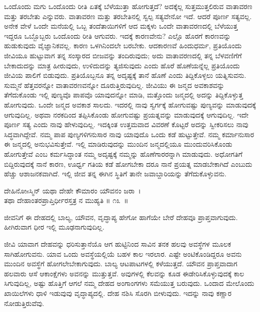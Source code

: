 ಒಂದೊಂದು ಮಗು ಒಂದೊಂದು ರೀತಿ ಏತಕ್ಕೆ ಬೆಳೆಯುತ್ತಾ ಹೋಗುತ್ತದೆ? ಅದಕ್ಕೆಲ್ಲ ಸುತ್ತಮುತ್ತಲಿರುವ ವಾತಾವರಣ ಮತ್ತು ತರಬೇತು ಎನ್ನುವರು. ವಾತಾವರಣ ಮತ್ತು ತರಬೇತಿನಲ್ಲಿ ಸ್ವಲ್ಪ ಸತ್ಯವೇನೋ ಇದೆ. ಆದರೆ ಪೂರ್ಣ ಸತ್ಯವಲ್ಲ. ಅನೇಕ ವೇಳೆ ಒಂದೇ ಮನೆಯಲ್ಲಿ ಒಬ್ಬ ತಂದೆತಾಯಿಗಳಿಗೆ ಆದ ಮಕ್ಕಳು ಒಂದೇ ವಾತಾವರಣದಲ್ಲಿ ಬೆಳೆಯುತ್ತ ಇದ್ದರೂ ಒಬ್ಬೊಬ್ಬರು ಒಂದೊಂದು ರೀತಿ ಆಗುವರು. ಇದಕ್ಕೆ ಕಾರಣವೇನು? ಎಲ್ಲೊ ಹೊರಗೆ ಕಾರಣವನ್ನು ಹುಡುಕುವುದು ವೈಜ್ಞಾನಿಕವಲ್ಲ. ಕಾರಣ ಒಳಗಿನಿಂದಲೇ ಬರಬೇಕು. ಆದಕಾರಣವೆ ಹಿಂದುಧರ್ಮ, ಪ್ರತಿಯೊಂದು ಜೀವಿಯೂ ಹುಟ್ಟುವಾಗ ತನ್ನ ಸಂಸ್ಕಾರದ ಬೀಜವನ್ನು ತಂದಿರುವುದು; ಅದು ವಾತಾವರಣದಲ್ಲಿ ತನ್ನ ಬೆಳವಣಿಗೆಗೆ ಬೇಕಾದುದನ್ನು ಮಾತ್ರ ಹೀರುವುದು, ಉಳಿದುದನ್ನು ತ್ಯಜಿಸುವುದು ಎಂದು ಹೊರೆ ಹೊಣೆಯನ್ನೆಲ್ಲ ಪ್ರತಿಯೊಂದು ಜೀವಿಯ ಪಾಲಿಗೆ ಬಿಡುವುದು. ಪ್ರತಿಯೊಬ್ಬನೂ ತನ್ನ ಅದೃಷ್ಟಕ್ಕೆ ತಾನೆ ಹೊಣೆ ಎಂದು ತಿದ್ದಿಕೊಳ್ಳಲು ಯತ್ನಿಸುವನು. ಸುಮ್ಮನೆ ಹೆತ್ತವರನ್ನೋ ವಾತಾವರಣವನ್ನೋ ದೂರುತ್ತಿರುವುದಿಲ್ಲ. ಜೀವಿಯು ಈ ಜನ್ಮದ ಅವಕಾಶವನ್ನು ತೆಗೆದುಕೊಂಡು ಇಲ್ಲಿ ಪುಣ್ಯವೊ ಪಾಪವೊ ಯಾವುದನ್ನೋ ಮಾಡಿ, ಮತ್ತೊಂದು ಜನ್ಮದಲ್ಲಿ ಅದನ್ನು ತಿದ್ದಿಕೊಳ್ಳುತ್ತ ಹೋಗುವುದು. ಒಂದೇ ಜನ್ಮದ ಅವಕಾಶ ಸಾಲದು. ಇದರಲ್ಲಿ ನಾವು ಸ್ವರ್ಗಕ್ಕೆ ಹೋಗುವಷ್ಟು ಪುಣ್ಯವನ್ನು ಮಾಡುವುದಕ್ಕೆ ಆಗುವುದಿಲ್ಲ. ಅಥವಾ ನರಕದಿಂದ ತಪ್ಪಿಸಿಕೊಂಡು ಹೋಗುವಷ್ಟು ಪ್ರಯತ್ನವನ್ನು ಮಾಡುವುದಕ್ಕೆ ಆಗುವುದಿಲ್ಲ. ಇದೇ ಪೂರ್ಣ ಸತ್ಯ ಎಂದು ನಾವು ಹೇಳುವುದಿಲ್ಲ. ಇದಕ್ಕಿಂತ ಉತ್ತಮವಾದ ವಿವರಣೆ ಕೊಟ್ಟರೆ ಅದನ್ನು ಸ್ವೀಕರಿಸಲು ನಾವು ಸಿದ್ಧವಾಗಿದ್ದೇವೆ. ನಮ್ಮ ಪಾಪ ಪುಣ್ಯಗಳಿಗನುಸಾರ ನಾವು ಯಾವುದೊ ಒಂದು ಕಡೆ ಹುಟ್ಟುತ್ತೇವೆ. ನಮ್ಮ ಕರ್ಮಾನುಸಾರ ಈ ಜನ್ಮದಲ್ಲಿ ಅನುಭವಿಸುತ್ತೇವೆ. ಇಲ್ಲಿ ಮಾಡಿರುವುದನ್ನು ಮುಂದಿನ ಜನ್ಮದಲ್ಲಿಯೂ ಮುಂದುವರಿಸಿಕೊಂಡು ಹೋಗುತ್ತೇವೆ ಎಂಬ ಕರ್ಮಸಿದ್ಧಾಂತ ನಮ್ಮ ಅದೃಷ್ಟಕ್ಕೆ ನಮ್ಮನ್ನು ಹೊಣೆಗಾರರನ್ನಾಗಿ ಮಾಡುವುದು. ಅಧೋಗತಿಗೆ ಬಿದ್ದಿರುವುದಕ್ಕೆ ನಾನೆ ಕಾರಣ, ಊರ್ಧ್ವ ಗತಿಯ ಕಡೆ ಹೋಗಬೇಕಾ ದರೂ ನಾನೆ ಪ್ರಯತ್ನ ಮಾಡಬೇಕಾಗಿದೆ ಎಂಬುದು ಹೆಚ್ಚು ಆಶಾಜನಕವಾಗಿದೆ. ಇಲ್ಲಿ ಜೀವ ತನ್ನ ಈಗಿನ ಸ್ಥಿತಿಗೆ ತಾನೇ ಜವಾಬ್ದಾರಿಯನ್ನು ತೆಗೆದುಕೊಳ್ಳುವನು.

\begin{shloka}
ದೇಹಿನೋsಸ್ಮಿನ್ ಯಥಾ ದೇಹೇ ಕೌಮಾರಂ ಯೌವನಂ ಜರಾ~।\\ತಥಾ ದೇಹಾಂತರಪ್ರಾಪ್ತಿರ್ಧೀರಸ್ತತ್ರ ನ ಮುಹ್ಯತಿ \hfill॥ ೧೩~॥
\end{shloka}

\begin{artha}
ಜೀವನಿಗೆ ಈ ದೇಹದಲ್ಲಿ ಬಾಲ್ಯ, ಯೌವನ, ವೃದ್ಧಾಪ್ಯ ಹೇಗೋ ಹಾಗೆಯೇ ಬೇರೆ ದೇಹವೂ ಪ್ರಾಪ್ತವಾಗುವುದು. ಹೀಗಿರುವಾಗ ಧೀರ ಇಲ್ಲಿ ಮೂಢನಾಗುವುದಿಲ್ಲ.
\end{artha}

ಜೀವಿ ಯಾವಾಗ ದೇಹವನ್ನು ಧರಿಸುತ್ತಾನೆಯೊ ಆಗ ಹುಟ್ಟಿನಿಂದ ಸಾವಿನ ತನಕ ಹಲವು ಅವಸ್ಥೆಗಳ ಮೂಲಕ ಸಾಗಿಹೋಗುವನು. ಯಾವ ಒಂದು ಅವಸ್ಥೆಯಲ್ಲಿಯೆ ಬಹಳ ಕಾಲ ಇರಲಾರ. ಎಷ್ಟೇ ಅಂಟಿಕೊಂಡಿದ್ದರೂ ಅವನು ಮುಂದಿನ ಅವಸ್ಥೆಗೆ ಹೋಗಲೇಬೇಕಾಗುವುದು. ಬಾಲ್ಯ ಆಟಪಾಟಗಳಲ್ಲಿ ಕಳೆಯುತ್ತದೆ. ಯೌವನ ಪ್ರಾಪ್ತವಾದಾಗ ಹಲವಾರು ಆಸೆ ಆಕಾಂಕ್ಷೆಗಳು ಅವನನ್ನು ಮುತ್ತುತ್ತವೆ. ಅವುಗಳಲ್ಲಿ ಕೆಲವನ್ನು ಕೂಡ ಈಡೇರಿಸಿಕೊಳ್ಳುವುದಕ್ಕೆ ಕಾಲ ಸಿಗುವುದಿಲ್ಲ, ಅಷ್ಟು ಹೊತ್ತಿಗೆ ಆಗಲೆ ನಮ್ಮ ದೇಹದ ಅಂಗಾಂಗಗಳು ಸಮೆಯುತ್ತ ಬರುವುದು. ಒಂದಾದ ಮೇಲೊಂದು ಖಾಯಿಲೆಗಳು ಧಾಳಿ ಇಡುವುವು ವೃದ್ಧಾಪ್ಯದಲ್ಲಿ. ದೇಹ ನಶಿಸಿ ಸೊರಗಿ ಬೀಳುವುದು. ಇದನ್ನು ನಾವು ಕಣ್ಣಾರ ನೋಡುತ್ತಿರುವೆವು.

